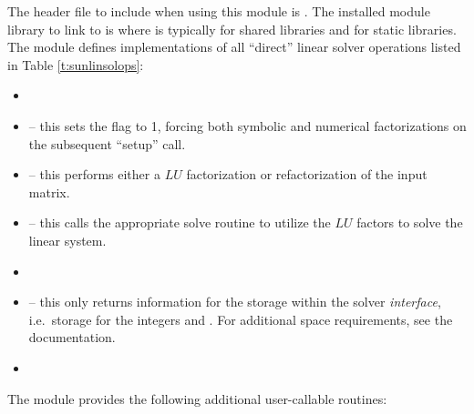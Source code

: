\noindent The header file to include when using this module 
is . The installed module
library to link to is
where  is typically  for shared libraries and
 for static libraries. \\


\noindent The {\sunlinsolklu} module defines implementations of all
``direct'' linear solver operations listed in
Table \ref{t:sunlinsolops}:
\begin{itemize}
\item {}
\item {} -- this sets the
   flag to 1, forcing both symbolic and numerical
  factorizations on the subsequent ``setup'' call.
\item {} -- this performs either a $LU$
  factorization or refactorization of the input matrix.
\item {} -- this calls the appropriate {\klu}
  solve routine to utilize the $LU$ factors to solve the linear
  system. 
\item {}
\item {} -- this only returns information for
  the storage within the solver \emph{interface}, i.e.~storage for the
  integers  and .  For additional
  space requirements, see the {\klu} documentation.
\item {}
\end{itemize}
The module {\sunlinsolklu} provides the following additional
user-callable routines: 
